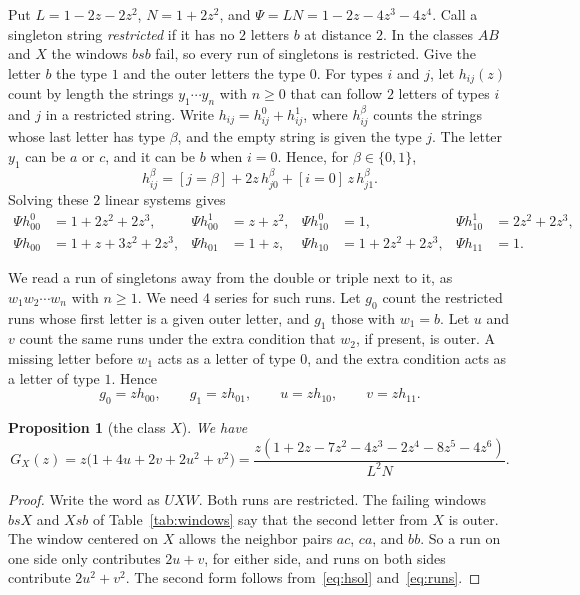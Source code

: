 \documentclass[12pt]{article}
\theoremstyle{plain}
\newtheorem{proposition}[theorem]{Proposition}
\theoremstyle{definition}
\theoremstyle{remark}
\begin{document}
Put $L=1-2z-2z^2$, $N=1+2z^2$, and $\Psi=LN=1-2z-4z^3-4z^4$. Call a singleton
string \emph{restricted} if it has no $2$ letters $b$ at distance $2$. In the
classes $AB$ and $X$ the windows $bsb$ fail, so every run of singletons is
restricted. Give the letter $b$ the type $1$ and the outer letters the type
$0$. For types $i$ and $j$, let $h_{ij}(z)$ count by length the strings
$y_1\cdots y_n$ with $n\ge0$ that can follow $2$ letters of types $i$ and $j$ in
a restricted string. Write $h_{ij}=h_{ij}^0+h_{ij}^1$, where $h_{ij}^\beta$
counts the strings whose last letter has type $\beta$, and the empty string is
given the type $j$. The letter $y_1$ can be $a$ or $c$, and it can be $b$ when
$i=0$. Hence, for $\beta\in\{0,1\}$,
\[
h_{ij}^\beta=[j=\beta]+2z\,h_{j0}^\beta+[i=0]\,z\,h_{j1}^\beta .
\]
Solving these $2$ linear systems gives
\begin{equation}\label{eq:hsol}
\begin{aligned}
\Psi h_{00}^0&=1+2z^2+2z^3,&\Psi h_{00}^1&=z+z^2,&\Psi h_{10}^0&=1,&\Psi h_{10}^1&=2z^2+2z^3,\\
\Psi h_{00}&=1+z+3z^2+2z^3,&\Psi h_{01}&=1+z,&\Psi h_{10}&=1+2z^2+2z^3,&\Psi h_{11}&=1.
\end{aligned}
\end{equation}

We read a run of singletons away from the double or triple next to it, as
$w_1w_2\cdots w_n$ with $n\ge1$. We need $4$ series for such runs. Let $g_0$
count the restricted runs whose first letter is a given outer letter, and
$g_1$ those with $w_1=b$. Let $u$ and $v$ count the same runs under the extra
condition that $w_2$, if present, is outer. A missing letter before $w_1$ acts
as a letter of type $0$, and the extra condition acts as a letter of type
$1$. Hence
\begin{equation}\label{eq:runs}
g_0=zh_{00},\qquad g_1=zh_{01},\qquad u=zh_{10},\qquad v=zh_{11}.
\end{equation}

\begin{proposition}[the class $X$]\label{prop:GX}
We have
\[
G_X(z)=z\bigl(1+4u+2v+2u^2+v^2\bigr)
=\frac{z(1+2z-7z^2-4z^3-2z^4-8z^5-4z^6)}{L^2N}.
\]
\end{proposition}

\begin{proof}
Write the word as $UXW$. Both runs are restricted. The failing windows $bsX$
and $Xsb$ of Table~\ref{tab:windows} say that the second letter from $X$ is
outer. The window centered on $X$ allows the neighbor pairs $ac$, $ca$, and
$bb$. So a run on one side only contributes $2u+v$, for either side, and
runs on both sides contribute $2u^2+v^2$. The second form follows
from~\eqref{eq:hsol} and~\eqref{eq:runs}.
\end{proof}
\end{document}
